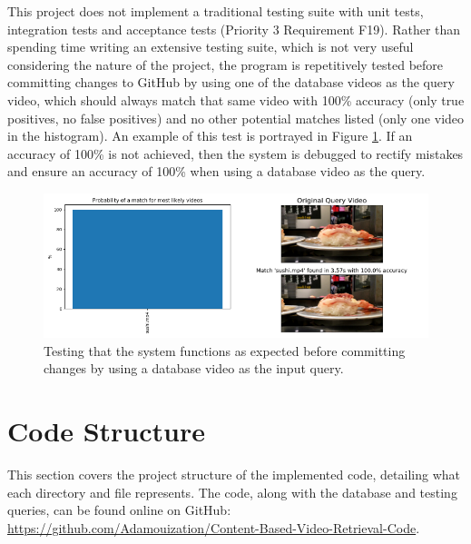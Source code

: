 This project does not implement a traditional testing suite with unit tests, integration tests and acceptance tests (Priority 3 Requirement F19). Rather than spending time writing an extensive testing suite, which is not very useful considering the nature of the project, the program is repetitively tested before committing changes to GitHub by using one of the database videos as the query video, which should always match that same video with 100\% accuracy (only true positives, no false positives) and no other potential matches listed (only one video in the histogram). An example of this test is portrayed in Figure \ref{fig:implementation-identity-query}. If an accuracy of 100\% is not achieved, then the system is debugged to rectify mistakes and ensure an accuracy of 100\% when using a database video as the query.

\begin{figure}[h] 
\centerline{\includegraphics[width=\textwidth]{figures/implementation/identity-query.png}}
\caption{\label{fig:implementation-identity-query}Testing that the system functions as expected before committing changes by using a database video as the input query.}
\end{figure}


\section{Code Structure}

This section covers the project structure of the implemented code, detailing what each directory and file represents. The code, along with the database and testing queries, can be found online on GitHub: \url{https://github.com/Adamouization/Content-Based-Video-Retrieval-Code}.

